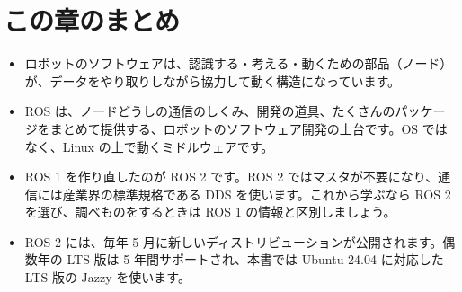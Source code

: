\section*{この章のまとめ}

\begin{itemize}
  \item ロボットのソフトウェアは、認識する・考える・動くための部品（ノード）が、データをやり取りしながら協力して動く構造になっています。
  \item ROS は、ノードどうしの通信のしくみ、開発の道具、たくさんのパッケージをまとめて提供する、ロボットのソフトウェア開発の土台です。OS ではなく、Linux の上で動くミドルウェアです。
  \item ROS 1 を作り直したのが ROS 2 です。ROS 2 ではマスタが不要になり、通信には産業界の標準規格である DDS を使います。これから学ぶなら ROS 2 を選び、調べものをするときは ROS 1 の情報と区別しましょう。
  \item ROS 2 には、毎年 5 月に新しいディストリビューションが公開されます。偶数年の LTS 版は 5 年間サポートされ、本書では Ubuntu 24.04 に対応した LTS 版の Jazzy を使います。
\end{itemize}

